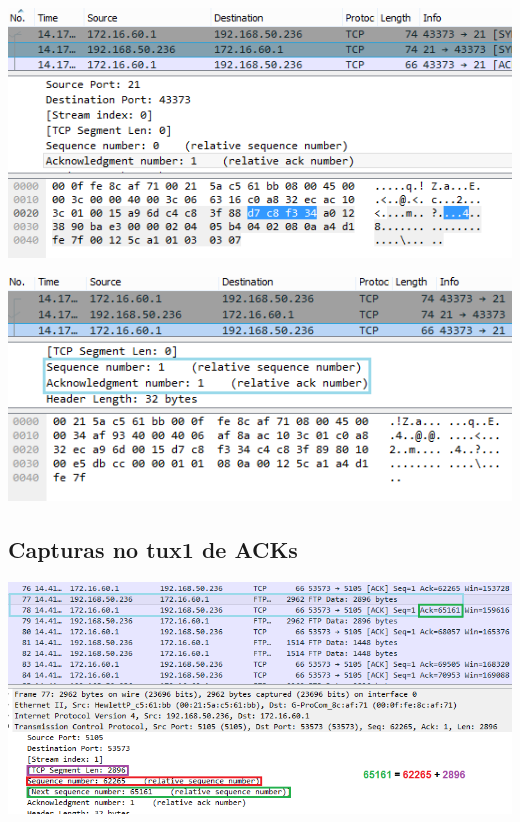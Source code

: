 \documentclass[11pt,a4paper,reqno]{report}
\numberwithin{equation}{section}
\begin{document}
\begin{appendices}
\includegraphics[width=16cm]{ex6_handshake2.png}

\includegraphics[width=16cm]{ex6_handshake3.png}

\subsection{Capturas no tux1 de ACKs}
\label{ex6_acks}
\includegraphics[width=16cm]{ex6_arq.png}


\end{appendices}
\end{document}
